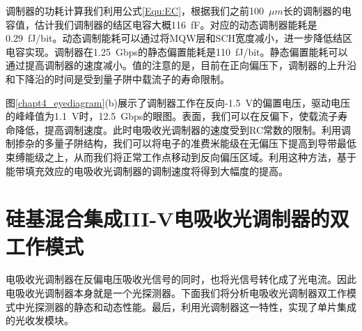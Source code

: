调制器的功耗计算我们利用公式\ref{Equ:EC}，根据我们之前100~$\mu m$长的调制器的电容值\cite{fu20155}，估计我们调制器的结区电容大概116~fF。对应的动态调制器能耗是0.29~fJ/bit。动态调制能耗可以通过将MQW层和SCH宽度减小，进一步降低结区电容实现。调制器在1.25~Gbps的静态偏置能耗是110~fJ/bit。静态偏置能耗可以通过提高调制器的速度减小。值的注意的是，目前在正向偏压下，调制器的上升沿和下降沿的时间是受到量子阱中载流子的寿命限制。

图\ref{chapt4_eyediagram}(b)展示了调制器工作在反向-1.5~V的偏置电压，驱动电压的峰峰值为1.1~V时，12.5~Gbps的眼图。表面，我们可以在反偏下，使载流子寿命降低，提高调制速度。此时电吸收光调制器的速度受到RC常数的限制。利用调制掺杂的多量子阱结构，我们可以将电子的准费米能级在无偏压下提高到导带最低束缚能级之上，从而我们将正常工作点移动到反向偏压区域\cite{livescu1988free,kalinovsky1993free}。利用这种方法，基于能带填充效应的电吸收光调制器的调制速度将得到大幅度的提高。

\section{硅基混合集成III-V电吸收光调制器的双工作模式}
电吸收光调制器在反偏电压吸收光信号的同时，也将光信号转化成了光电流。因此电吸收光调制器本身就是一个光探测器。下面我们将分析电吸收光调制器双工作模式中光探测器的静态和动态性能。最后，利用光调制器这一特性，实现了单片集成的光收发模块。
